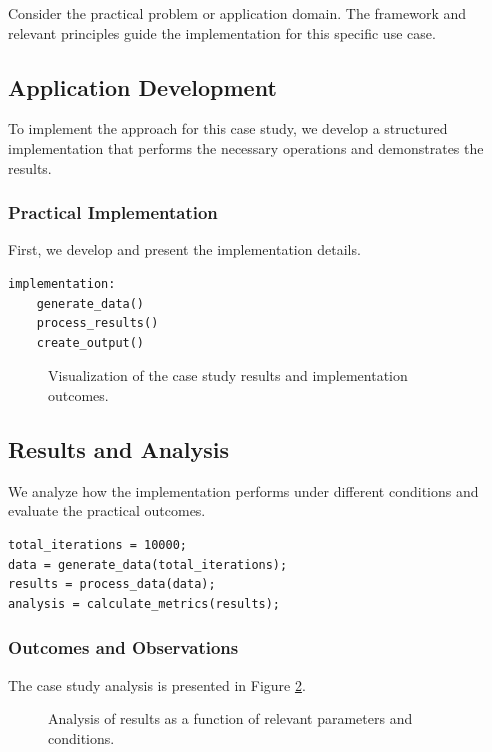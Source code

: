 Consider the practical problem or application domain. The framework and relevant principles guide the implementation for this specific use case.

\subsection{Application Development}
To implement the approach for this case study, we develop a structured implementation that performs the necessary operations and demonstrates the results.

\subsubsection{Practical Implementation}

First, we develop and present the implementation details.

\begin{lstlisting}[caption={Implementation Code}, label={lst:viz}]
implementation:
    generate_data()
    process_results()
    create_output()
\end{lstlisting}

\begin{figure}[h!]
    \centering
    \caption{Visualization of the case study results and implementation outcomes.}
    \label{fig:sample}
\end{figure}

\subsection{Results and Analysis}
We analyze how the implementation performs under different conditions and evaluate the practical outcomes.

\begin{lstlisting}[caption={Results Analysis}, label={lst:piconv}]
total_iterations = 10000;
data = generate_data(total_iterations);
results = process_data(data);
analysis = calculate_metrics(results);
\end{lstlisting}

\subsubsection{Outcomes and Observations}
The case study analysis is presented in Figure \ref{fig:convergence}.

\begin{figure}[h!]
    \centering
    \caption{Analysis of results as a function of relevant parameters and conditions.}
    \label{fig:convergence}
\end{figure}


